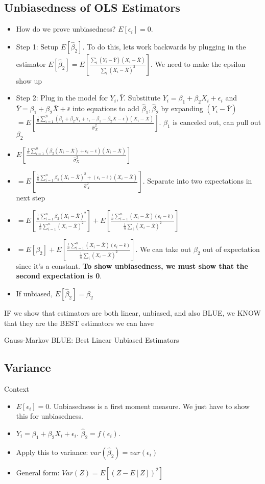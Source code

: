 \documentclass[10pt, oneside]{article}
\begin{document}
\subsection{Unbiasedness of OLS Estimators}
\begin{itemize}
    \item How do we prove unbiasedness? $E[\epsilon_i]=0$. 
    \item Step 1: Setup $E[\hat \beta_2 ]$. To do this, lets work backwards by plugging in the estimator $E[\hat \beta_2]=E[\frac{\sum_i (Y_i -\bar Y) (X_i -\bar X)}{\sum_i (X_i -\bar X)^2}]$. We need to make the epsilon show up 
    \item Step 2: Plug in the model for $Y_i, \bar Y$. Substitute $Y_i=\beta_1 + \beta_2 X_i + \epsilon_i$ and $\bar Y=\beta_1 +\beta_2 \bar X + \bar \epsilon$ into equations to add $\hat \beta_1, \hat \beta_2$ by expanding $(Y_i -\bar Y)$ \\
    $=E[\frac{\frac{1}{n} 
    \sum_{i=1} ^ n(\beta_1 + \beta_2 X_i + \epsilon_i - \beta_1 - \beta_2 \bar X -\bar \epsilon)(X_i -\bar X)}{\hat \sigma_X ^2}]$. $\beta_1$ is canceled out, can pull out $\beta_2$
    \item $E[\frac{\frac{1}{n} \sum_{i=1} ^ n (\beta_2 (X_i -\bar X) + \epsilon_i -\bar \epsilon)(X_i -\bar X)}{\hat \sigma_X ^2}]$
    \item $=E[\frac{\frac{1}{n} \sum_{i=1}^n \beta_2 (X_i - \bar X)^2 + (\epsilon_i -\bar \epsilon) (X_i -\bar X)}{\hat \sigma_X ^2}]$. Separate into two expectations in next step
    \item $=E[\frac{\frac{1}{n}\sum_{i=1} ^n \beta_2 (X_i -\bar X)^2}{\frac{1}{n} \sum_{i=1} ^n (X_i - \bar X)^2}] + E[ \frac{\frac{1}{n}\sum_{i=1} ^ n (X_i -\bar X) (\epsilon_i -\bar \epsilon)}{\frac{1}{n} \sum_i(X_i -\bar X)^2}]$
    \item $=E[\beta_2] + E[ \frac{\frac{1}{n}\sum_{i=1} ^ n (X_i -\bar X) (\epsilon_i -\bar \epsilon)}{\frac{1}{n} \sum_i(X_i -\bar X)^2}]$. We can take out $\beta_2$ out of expectation since it's a constant. \textbf{To show unbiasedness, we must show that the second expectation is 0}.
    \item If unbiased, $E[\hat \beta_2] = \beta_2$
\end{itemize}

IF we show that estimators are both linear, unbiased, and also BLUE, we KNOW that they are the BEST estimators we can have

Gauss-Markov BLUE: Best Linear Unbiased Estimators
\subsection{Variance}
Context
\begin{itemize}
    \item $E[\epsilon_i] =0$. Unbiasedness is a first moment measure. We just have to show this for unbiasedness.
    \item $Y_i = \beta_1 + \beta_2 X_i +\epsilon_i$. $\hat \beta_2 =f(\epsilon_i)$.
    \item Apply this to variance: $var(\hat \beta_2) = var(\epsilon_i)$
    \item General form: $Var(Z)=E[(Z-E[Z])^2]$
\end{itemize}
\end{document}
